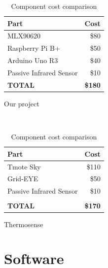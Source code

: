 \documentclass[../thesis/thesis.tex]{subfiles}
\begin{document}
\begin{table}
\centering
\begin{subtable}[b]{0.5\textwidth}
\centering
\begin{tabular}{|l|r|}
\hline
\textbf{Part} & \textbf{Cost} \\ \hline
MLX90620 & \$80 \\ \hline
Raspberry Pi B+ &  \$50 \\ \hline
Arduino Uno R3 & \$40 \\ \hline
Passive Infrared Sensor & \$10 \\ \hline
\textbf{TOTAL} & \textbf{\$180} \\ \hline
\end{tabular}
\caption{Our project}
\label{tab:sensor:cost}
\end{subtable}%
~%
\begin{subtable}[b]{0.5\textwidth}
\centering
\begin{tabular}{|l|r|}
\hline
\textbf{Part} & \textbf{Cost} \\ \hline
Tmote Sky & \$110 \\ \hline
Grid-EYE & \$50 \\ \hline
Passive Infrared Sensor & \$10 \\ \hline
 & \\ \hline
\textbf{TOTAL} & \textbf{\$170} \\ \hline
\end{tabular}
\caption{Thermosense}
\label{tab:sensor:thermosensecost}
\end{subtable}
\caption{Component cost comparison}
\end{table}


\section{Software}
\end{document}
